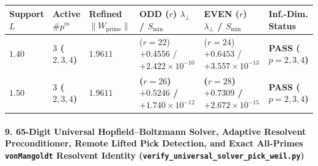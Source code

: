 \documentclass[
  11pt,
]{article}
\newcounter{none} %
\begin{document}
\begin{enumerate}
  {\def\LTcaptype{none} %
  \begin{longtable}[]{@{}
    >{\centering\arraybackslash}p{}
    >{\centering\arraybackslash}p{}
    >{\centering\arraybackslash}p{}
    >{\centering\arraybackslash}p{}
    >{\centering\arraybackslash}p{}
    >{\raggedright\arraybackslash}p{}@{}}
  \toprule\noalign{}
  \begin{minipage}[b]{\linewidth}\centering
  Support \(L\)
  \end{minipage} & \begin{minipage}[b]{\linewidth}\centering
  Active \(\#p^m\)
  \end{minipage} & \begin{minipage}[b]{\linewidth}\centering
  Refined \(\|W_{\text{prime}}\|\)
  \end{minipage} & \begin{minipage}[b]{\linewidth}\centering
  ODD (\(r\)) \(\lambda_\perp\) / \(S_{\min}\)
  \end{minipage} & \begin{minipage}[b]{\linewidth}\centering
  EVEN (\(r\)) \(\lambda_\perp\) / \(S_{\min}\)
  \end{minipage} & \begin{minipage}[b]{\linewidth}\raggedright
  Inf.-Dim. Status
  \end{minipage} \\
  \midrule\noalign{}
  \endhead
  \bottomrule\noalign{}
  \endlastfoot
  \(1.40\) & \textbf{\(3\) (\(2, 3, 4\))} & \(1.9611\) & (\(r=22\))
  \(+0.4556\) / \(+2.422 \times 10^{-10}\) & (\(r=24\)) \(+0.6453\) /
  \(+3.557 \times 10^{-13}\) & \textbf{PASS (\(p=2,3,4\))} \\
  \textbf{\(1.50\)} & \textbf{\(3\) (\(2, 3, 4\))} & \textbf{\(1.9611\)}
  & \textbf{(\(r=26\)) \(+0.5246\) / \(+1.740 \times 10^{-12}\)} &
  \textbf{(\(r=28\)) \(+0.7309\) / \(+2.672 \times 10^{-15}\)} &
  \textbf{PASS (\(p=2,3,4\))} \\
  \end{longtable}
  }
\end{enumerate}

\paragraph{\texorpdfstring{9. 65-Digit Universal Hopfield--Boltzmann
Solver, Adaptive Resolvent Preconditioner, Remote Lifted Pick Detection,
and Exact All-Primes \texttt{vonMangoldt} Resolvent Identity
(\texttt{verify\_universal\_solver\_pick\_weil.py})}{9. 65-Digit Universal Hopfield--Boltzmann Solver, Adaptive Resolvent Preconditioner, Remote Lifted Pick Detection, and Exact All-Primes vonMangoldt Resolvent Identity (verify\_universal\_solver\_pick\_weil.py)}}\label{digit-universal-hopfieldboltzmann-solver-adaptive-resolvent-preconditioner-remote-lifted-pick-detection-and-exact-all-primes-vonmangoldt-resolvent-identity-verify_universal_solver_pick_weil.py}
\end{document}
